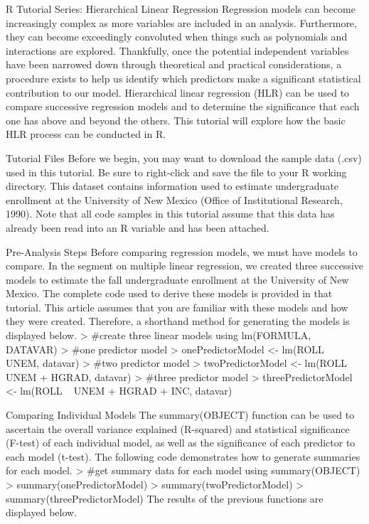 
R Tutorial Series: Hierarchical Linear Regression
Regression models can become increasingly complex as more variables are included in an analysis. Furthermore, they can become exceedingly convoluted when things such as polynomials and interactions are explored. Thankfully, once the potential independent variables have been narrowed down through theoretical and practical considerations, a procedure exists to help us identify which predictors make a significant statistical contribution to our model. Hierarchical linear regression (HLR) can be used to compare successive regression models and to determine the significance that each one has above and beyond the others. This tutorial will explore how the basic HLR process can be conducted in R.

Tutorial Files
Before we begin, you may want to download the sample data (.csv) used in this tutorial. Be sure to right-click and save the file to your R working directory. This dataset contains information used to estimate undergraduate enrollment at the University of New Mexico (Office of Institutional Research, 1990). Note that all code samples in this tutorial assume that this data has already been read into an R variable and has been attached.

Pre-Analysis Steps
Before comparing regression models, we must have models to compare. In the segment on multiple linear regression, we created three successive models to estimate the fall undergraduate enrollment at the University of New Mexico. The complete code used to derive these models is provided in that tutorial. This article assumes that you are familiar with these models and how they were created. Therefore, a shorthand method for generating the models is displayed below.
> #create three linear models using lm(FORMULA, DATAVAR)
> #one predictor model
> onePredictorModel <- lm(ROLL ~ UNEM, datavar)
> #two predictor model
> twoPredictorModel <- lm(ROLL ~ UNEM + HGRAD, datavar)
> #three predictor model
> threePredictorModel <- lm(ROLL ~ UNEM + HGRAD + INC, datavar)

Comparing Individual Models
The summary(OBJECT) function can be used to ascertain the overall variance explained (R-squared) and statistical significance (F-test) of each individual model, as well as the significance of each predictor to each model (t-test). The following code demonstrates how to generate summaries for each model.
> #get summary data for each model using summary(OBJECT)
> summary(onePredictorModel)
> summary(twoPredictorModel)
> summary(threePredictorModel)
The results of the previous functions are displayed below.



